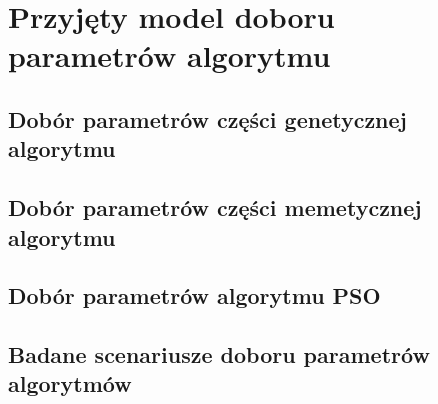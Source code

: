 \newpage
\chapter{Przyjęty model doboru parametrów algorytmu}
\label{ch:przyjety_model_doboru_parametrow_algorytmu}

\section{Dobór parametrów części genetycznej algorytmu}


\section{Dobór parametrów części memetycznej algorytmu}

\section{Dobór parametrów algorytmu PSO}

\section{Badane scenariusze doboru parametrów algorytmów}
